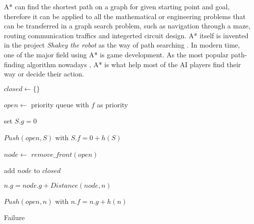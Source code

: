 \documentclass[catalog.tex]{subfiles}
\begin{document}
A* can find the shortest path on a graph for given starting point and goal, therefore it can be applied to all the mathematical or engineering problems that can be transferred in a graph search problem, such as navigation through a maze, routing communication traffics and integerted circuit design. A* itself is invented in the project \textit{Shakey the robot} as the way of path searching \cite{shakey}. In modern time, one of the major field using A* is game development. As the most popular path-finding algorithm nowadays \cite{cui2011based}, A* is what help most of the AI players find their way or decide their action.



\begin{Algorithm}[A* Search\label{alg:\currfilebase}]
    $closed \gets \{\}$ 

    $open \gets$ priority queue with $f$ as priority

    set $S.g=0$
    
    $Push(open, S)$ with $S.f=0+h(S)$

    {
        $node \gets$ $remove\_front(open)$

        {
            \Ret 
        }

        {
            add $node$ to $closed$

            {
                $n.g = node.g + Distance(node, n)$

                $Push(open, n)$ with $n.f=n.g+h(n)$
            }
        }
        
    }

	\BlankLine

	\Ret Failure

\end{Algorithm}
\end{document}
